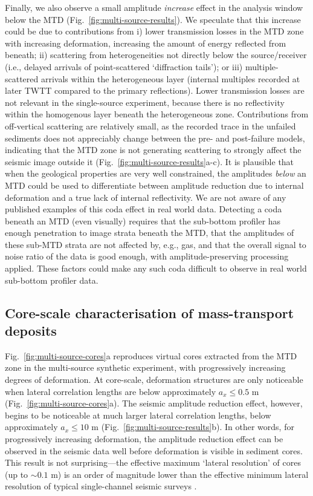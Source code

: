 \documentclass[se,manuscript]{copernicus}
\begin{document}
Finally, we also observe a small amplitude \emph{increase} effect in the analysis window below the MTD (Fig.~\ref{fig:multi-source-results}).
We speculate that this increase could be due to contributions from i) lower transmission losses in the MTD zone with increasing deformation, increasing the amount of energy reflected from beneath; ii) scattering from heterogeneities not directly below the source/receiver (i.e., delayed arrivals of point-scattered `diffraction tails'); or iii) multiple-scattered arrivals within the heterogeneous layer (internal multiples recorded at later TWTT compared to the primary reflections).
Lower transmission losses are not relevant in the single-source experiment, because there is no reflectivity within the homogenous layer beneath the heterogeneous zone.
Contributions from off-vertical scattering are relatively small, as the recorded trace in the unfailed sediments does not appreciably change between the pre- and post-failure models, indicating that the MTD zone is not generating scattering to strongly affect the seismic image outside it (Fig.~\ref{fig:multi-source-results}a-c).
It is plausible that when the geological properties are very well constrained, the amplitudes \emph{below} an MTD could be used to differentiate between amplitude reduction due to internal deformation and a true lack of internal reflectivity.
We are not aware of any published examples of this coda effect in real world data.
Detecting a coda beneath an MTD (even visually) requires that the sub-bottom profiler has enough penetration to image strata beneath the MTD, that the amplitudes of these sub-MTD strata are not affected by, e.g., gas, and that the overall signal to noise ratio of the data is good enough, with amplitude-preserving processing applied.
These factors could make any such coda difficult to observe in real world sub-bottom profiler data.

\subsection{Core-scale characterisation of mass-transport deposits}
\label{sec:core-scale}
Fig.~\ref{fig:multi-source-cores}a reproduces virtual cores extracted from the MTD zone in the multi-source synthetic experiment, with progressively increasing degrees of deformation.
At core-scale, deformation structures are only noticeable when lateral correlation lengths are below approximately $a_x \leq 0.5$ \unit{m} (Fig.~\ref{fig:multi-source-cores}a).
The seismic amplitude reduction effect, however, begins to be noticeable at much larger lateral correlation lengths, below approximately $a_x \leq 10$ \unit{m} (Fig.~\ref{fig:multi-source-results}b).
In other words, for progressively increasing deformation, the amplitude reduction effect can be observed in the seismic data well before deformation is visible in sediment cores.
This result is not surprising---the effective maximum `lateral resolution' of cores (up to $\sim0.1$ \unit{m}) is an order of magnitude lower than the effective minimum lateral resolution of typical single-channel seismic surveys \citep[metre-scale,][]{vardy_deriving_2015}.
\end{document}
